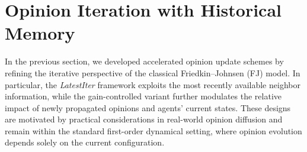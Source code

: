 \documentclass[sigconf,review, nonacm]{acmart}
\begin{document}







\section{Opinion Iteration with Historical Memory}

In the previous section, we developed accelerated opinion update schemes by refining
the iterative perspective of the classical Friedkin--Johnsen (FJ) model.
In particular, the \emph{LatestIter} framework exploits the most recently available neighbor information, while the gain-controlled variant further modulates the relative impact of newly propagated opinions and agents' current states.
These designs are motivated by practical considerations in real-world opinion diffusion and remain within the standard first-order dynamical setting, where
opinion evolution depends solely on the current configuration.
\end{document}
